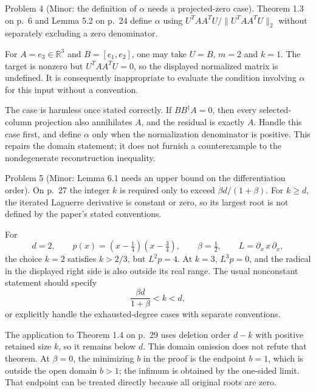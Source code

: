 \documentclass[10pt]{article}
\begin{document}
Problem 4 (Minor: the definition of \(\alpha\) needs a projected-zero case).  Theorem 1.3 on p. 6 and Lemma 5.2 on p. 24 define \(\alpha\) using \(U^TAA^TU/\|U^TAA^TU\|_2\) without separately excluding a zero denominator.\par
For \(A=e_3\in\mathbb R^3\) and \(B=[e_1,e_2]\), one may take \(U=B\), \(m=2\) and \(k=1\). The target is nonzero but \(U^TAA^TU=0\), so the displayed normalized matrix is undefined. It is consequently inappropriate to evaluate the condition involving \(\alpha\) for this input without a convention.\par
The case is harmless once stated correctly. If \(BB^\dagger A=0\), then every selected-column projection also annihilates \(A\), and the residual is exactly \(A\). Handle this case first, and define \(\alpha\) only when the normalization denominator is positive. This repairs the domain statement; it does not furnish a counterexample to the nondegenerate reconstruction inequality.\par
Problem 5 (Minor: Lemma 6.1 needs an upper bound on the differentiation order).  On p. 27 the integer \(k\) is required only to exceed \(\beta d/(1+\beta)\). For \(k\geq d\), the iterated Laguerre derivative is constant or zero, so its largest root is not defined by the paper’s stated conventions.\par
For \[d=2,\qquad p(x)=(x-\tfrac14)(x-\tfrac34),\qquad \beta=\tfrac12,
 \qquad L=\partial_x\,x\,\partial_x,\] the choice \(k=2\) satisfies \(k>2/3\), but \(L^2p=4\). At \(k=3\), \(L^3p=0\), and the radical in the displayed right side is also outside its real range. The usual nonconstant statement should specify \[\frac{\beta d}{1+\beta}<k<d,\] or explicitly handle the exhausted-degree cases with separate conventions.\par
The application to Theorem 1.4 on p. 29 uses deletion order \(d-k\) with positive retained size \(k\), so it remains below \(d\). This domain omission does not refute that theorem. At \(\beta=0\), the minimizing \(b\) in the proof is the endpoint \(b=1\), which is outside the open domain \(b>1\); the infimum is obtained by the one-sided limit. That endpoint can be treated directly because all original roots are zero.\par
\end{document}
